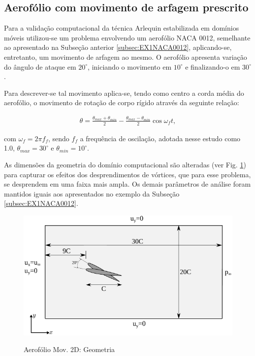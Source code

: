 \documentclass[tese_patricia]{subfiles}
\begin{document}
\subsection{Aerofólio com movimento de arfagem prescrito}


Para a validação computacional da técnica Arlequin estabilizada em domínios móveis  utilizou-se um problema envolvendo um aerofólio NACA 0012, semelhante ao apresentado na Subseção anterior \ref{subsec:EX1NACA0012}, aplicando-se, entretanto, um movimento de arfagem ao mesmo. O aerofólio apresenta variação do ângulo de ataque em $20^{\circ}$, iniciando o movimento em $10^{\circ}$ e finalizando-o em $30^{\circ}$. 

Para descrever-se tal movimento aplica-se, tendo como centro a corda média do aerofólio, o movimento de rotação de corpo rígido através da seguinte relação:

\begin{align}
	\theta = \frac{\theta_{max}+\theta_{min}}{2} - \frac{\theta_{max}-\theta_{min}}{2}\cos{\omega_{f}t} ,
\end{align}

\noindent com $\omega_{f} = 2\pi f_{f}$, sendo $f_{f}$ a frequência de oscilação, adotada nesse estudo como 1.0, $\theta_{max} = 30^{\circ}$ e $\theta_{min} = 10^{\circ}$.

As dimensões da geometria do domínio computacional são alteradas (ver Fig. \ref{fig:AerofolioMoving}) para capturar os efeitos dos desprendimentos de vórtices, que para esse problema, se desprendem em uma faixa mais ampla. Os demais parâmetros de análise foram mantidos iguais aos apresentados no exemplo da Subseção \ref{subsec:EX1NACA0012}. 

\begin{figure}[htb!]
	\centering 
	{\includegraphics[scale=1.0,trim=0cm 0cm 0cm 0cm, clip=true]{Imagens/Cap6/aerofolioMov.pdf}}	
	\caption{Aerofólio Mov. 2D: Geometria}
	\label{fig:AerofolioMoving}
\end{figure}
\end{document}
